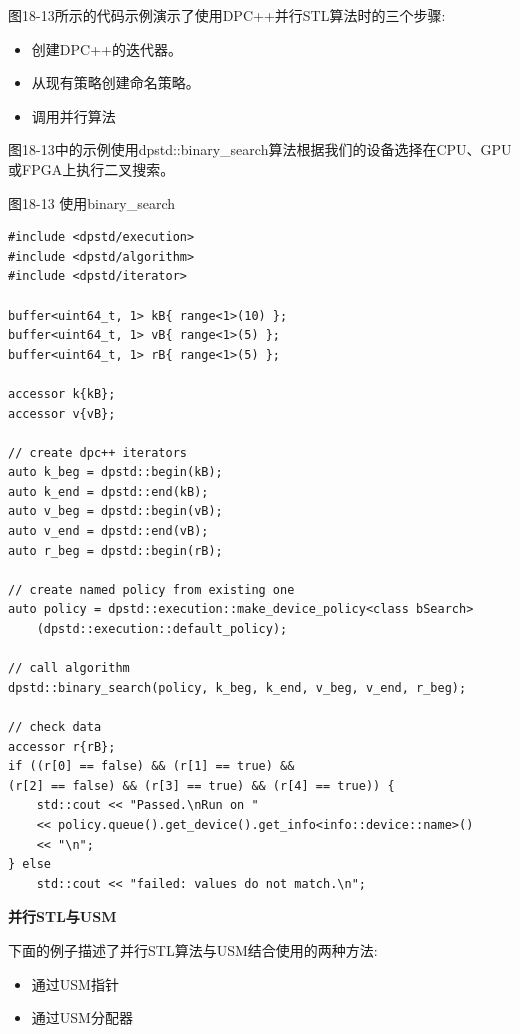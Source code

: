 图18-13所示的代码示例演示了使用DPC++并行STL算法时的三个步骤:\par

\begin{itemize}
	\item 创建DPC++的迭代器。
	\item 从现有策略创建命名策略。
	\item 调用并行算法
\end{itemize}

图18-13中的示例使用dpstd::binary\_search算法根据我们的设备选择在CPU、GPU或FPGA上执行二叉搜索。\par

\hspace*{\fill} \par %
图18-13 使用binary\_search
\begin{lstlisting}[caption={}]
#include <dpstd/execution>
#include <dpstd/algorithm>
#include <dpstd/iterator>

buffer<uint64_t, 1> kB{ range<1>(10) };
buffer<uint64_t, 1> vB{ range<1>(5) };
buffer<uint64_t, 1> rB{ range<1>(5) };

accessor k{kB};
accessor v{vB};

// create dpc++ iterators
auto k_beg = dpstd::begin(kB);
auto k_end = dpstd::end(kB);
auto v_beg = dpstd::begin(vB);
auto v_end = dpstd::end(vB);
auto r_beg = dpstd::begin(rB);

// create named policy from existing one
auto policy = dpstd::execution::make_device_policy<class bSearch>
	(dpstd::execution::default_policy);

// call algorithm
dpstd::binary_search(policy, k_beg, k_end, v_beg, v_end, r_beg);

// check data
accessor r{rB};
if ((r[0] == false) && (r[1] == true) && 
(r[2] == false) && (r[3] == true) && (r[4] == true)) {
	std::cout << "Passed.\nRun on "
	<< policy.queue().get_device().get_info<info::device::name>()
	<< "\n";
} else
	std::cout << "failed: values do not match.\n";
\end{lstlisting}

\hspace*{\fill} \par %
\textbf{并行STL与USM}

下面的例子描述了并行STL算法与USM结合使用的两种方法:\par

\begin{itemize}
	\item 通过USM指针
	\item 通过USM分配器
\end{itemize}

